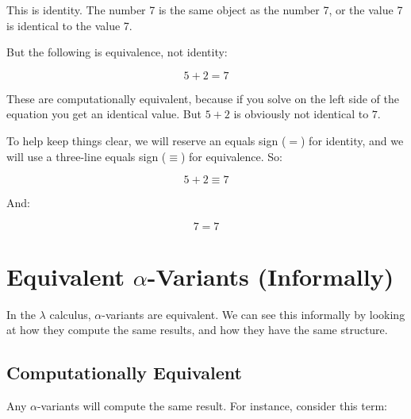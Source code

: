 \documentclass{book}
\numberwithin{equation}{chapter}
\begin{document}
\noindent
This is identity. The number 7 is the same object as the number 7, or the value 7 is identical to the value 7.

But the following is equivalence, not identity:

\begin{equation}
5 + 2 = 7
\end{equation}

\noindent
These are computationally equivalent, because if you solve on the left side of the equation you get an identical value. But $5 + 2$ is obviously not identical to $7$.

To help keep things clear, we will reserve an equals sign ($=$) for identity, and we will use a three-line equals sign ($\equiv$) for equivalence. So:

\begin{equation}
5 + 2 \equiv 7
\end{equation}

\noindent
And:

\begin{equation}
7 = 7
\end{equation}



\chapter{Equivalent $\alpha$-Variants (Informally)}

In the $\lambda$ calculus, $\alpha$-variants are equivalent. We can see this informally by looking at how they compute the same results, and how they have the same structure.


\section{Computationally Equivalent}

Any $\alpha$-variants will compute the same result. For instance, consider this term:
\end{document}
